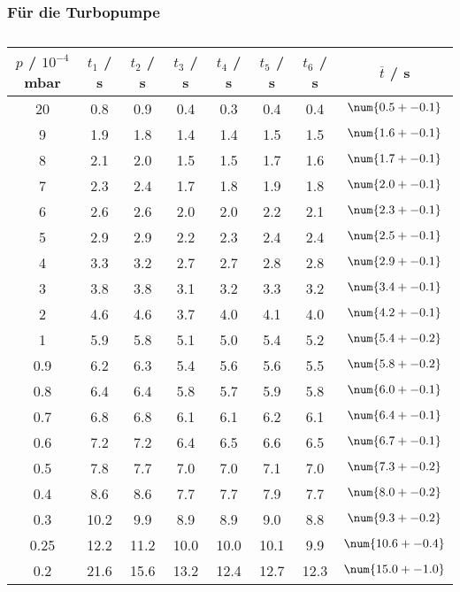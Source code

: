 \subsubsection{Für die Turbopumpe}

\begin{table} %
  \centering
  \caption{}
  \label{tab:}
  \begin{tabular}{c|c|c|c|c|c|c|c}
    $p$ / $10^{-4}$ mbar & $t_1$ / s & $t_2$ / s & $t_3$ / s & $t_4$ / s & $t_5$ / s & $t_6$ / s & $\overline{t}$ / s \\
    \hline
    20   & 0.8  & 0.9  & 0.4  & 0.3  & 0.4  & 0.4  & $\num{0.5 +- 0.1}$ \\
    9    & 1.9  & 1.8  & 1.4  & 1.4  & 1.5  & 1.5  & $\num{1.6 +- 0.1}$ \\
    8    & 2.1  & 2.0  & 1.5  & 1.5  & 1.7  & 1.6  & $\num{1.7 +- 0.1}$ \\
    7    & 2.3  & 2.4  & 1.7  & 1.8  & 1.9  & 1.8  & $\num{2.0 +- 0.1}$ \\
    6    & 2.6  & 2.6  & 2.0  & 2.0  & 2.2  & 2.1  & $\num{2.3 +- 0.1}$ \\
    5    & 2.9  & 2.9  & 2.2  & 2.3  & 2.4  & 2.4  & $\num{2.5 +- 0.1}$ \\
    4    & 3.3  & 3.2  & 2.7  & 2.7  & 2.8  & 2.8  & $\num{2.9 +- 0.1}$ \\
    3    & 3.8  & 3.8  & 3.1  & 3.2  & 3.3  & 3.2  & $\num{3.4 +- 0.1}$ \\
    2    & 4.6  & 4.6  & 3.7  & 4.0  & 4.1  & 4.0  & $\num{4.2 +- 0.1}$ \\
    1    & 5.9  & 5.8  & 5.1  & 5.0  & 5.4  & 5.2  & $\num{5.4 +- 0.2}$ \\
    0.9  & 6.2  & 6.3  & 5.4  & 5.6  & 5.6  & 5.5  & $\num{5.8 +- 0.2}$ \\
    0.8  & 6.4  & 6.4  & 5.8  & 5.7  & 5.9  & 5.8  & $\num{6.0 +- 0.1}$ \\
    0.7  & 6.8  & 6.8  & 6.1  & 6.1  & 6.2  & 6.1  & $\num{6.4 +- 0.1}$ \\
    0.6  & 7.2  & 7.2  & 6.4  & 6.5  & 6.6  & 6.5  & $\num{6.7 +- 0.1}$ \\
    0.5  & 7.8  & 7.7  & 7.0  & 7.0  & 7.1  & 7.0  & $\num{7.3 +- 0.2}$ \\
    0.4  & 8.6  & 8.6  & 7.7  & 7.7  & 7.9  & 7.7  & $\num{8.0 +- 0.2}$ \\
    0.3  & 10.2 & 9.9  & 8.9  & 8.9  & 9.0  & 8.8  & $\num{9.3 +- 0.2}$ \\
    0.25 & 12.2 & 11.2 & 10.0 & 10.0 & 10.1 & 9.9  & $\num{10.6 +- 0.4}$ \\
    0.2  & 21.6 & 15.6 & 13.2 & 12.4 & 12.7 & 12.3 & $\num{15.0 +- 1.0}$ \\
  \end{tabular}
\end{table}

